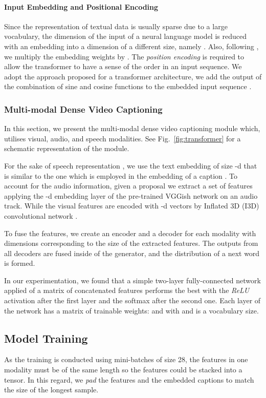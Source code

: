 \documentclass[10pt,twocolumn,letterpaper]{article}
\begin{document}
\paragraph{Input Embedding and Positional Encoding} 
Since the representation of textual data is usually sparse due to a large vocabulary, the dimension of the input of a neural language model is reduced with an embedding into a dimension of a different size, namely . Also, following \cite{Vaswani2017}, we multiply the embedding weights by .  The \textit{position encoding} is required to allow the transformer to have a sense of the order in an input sequence. We adopt the approach proposed for a transformer architecture, \ie we add the output of the combination of sine and cosine functions to the embedded input sequence \cite{Vaswani2017}. 

\subsubsection{Multi-modal Dense Video Captioning} 
In this section, we present the multi-modal dense video captioning module which, utilises visual, audio, and speech modalities. See Fig.~\ref{fig:transformer} for a schematic representation of the module.

For the sake of speech representation , we use the text embedding of size -d that is similar to the one which is employed in the embedding of a caption . To account for the audio information, given a proposal  we extract a set of features  applying the -d embedding layer of the pre-trained VGGish network \cite{Hershey2017} on an audio track. While the visual features  are encoded with -d vectors by Inflated 3D (I3D) convolutional network \cite{Carreira2017}.

To fuse the features, we create an encoder and a decoder for each modality with dimensions corresponding to the size of the extracted features. The outputs from all decoders are fused inside of the generator, and the distribution of a next word  is formed. 

In our experimentation, we found that a simple two-layer fully-connected network applied of a matrix of concatenated features performs the best with the \textit{ReLU} activation after the first layer and the softmax after the second one. Each layer of the network has a matrix of trainable weights:  and  with  and  is a vocabulary size.

\subsection{Model Training}
As the training is conducted using mini-batches of size 28, the features in one modality must be of the same length so the features could be stacked into a tensor. In this regard, we \textit{pad} the features and the embedded captions to match the size of the longest sample. 
\end{document}
